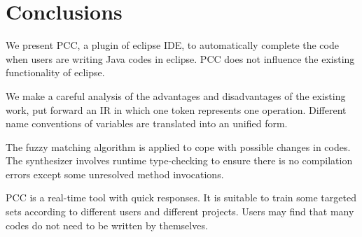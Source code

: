 \documentclass{sig-alternate-05-2015}
\begin{document}
\section{Conclusions}

We present PCC, a plugin of eclipse IDE, to automatically complete the code when users are writing Java codes in eclipse.
PCC does not influence the existing functionality of eclipse.

We make a careful analysis of the advantages and disadvantages of the existing work, put forward an IR in which one token represents one operation. Different name conventions of variables are translated into an unified form.

The fuzzy matching algorithm is applied to cope with possible changes in codes. The synthesizer involves runtime type-checking to ensure there is no compilation errors except some unresolved method invocations.

PCC is a real-time tool with quick responses. It is suitable to train some targeted sets according to different users and different projects. Users may find that many codes do not need to be written by themselves.

\newpage
%

\end{document}
